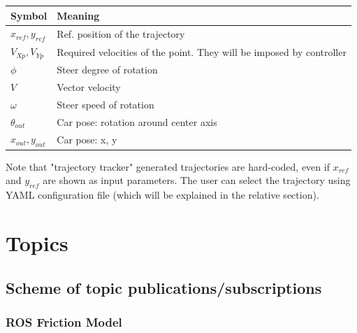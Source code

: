 \documentclass[12pt, letterpaper]{report}
\begin{document}
\vspace{1cm}

\begin{center}
	\begin{tabularx}{\textwidth}{|l|X|}
		\hline
		\textbf{Symbol} & \textbf{Meaning} \\
		\hline
		$x_{ref}, y_{ref}$ & Ref. position of the trajectory \\
		\hline
		$V_{Xp}, V_{Yp}$ & Required velocities of the point. They will be imposed by controller\\
		\hline
		$\phi$ & Steer degree of rotation \\
		\hline
		$V$ & Vector velocity \\
		\hline
		$\omega$ & Steer speed of rotation \\
		\hline
		$\theta_{out}$ & Car pose: rotation around center axis\\
		\hline
		$x_{out}, y_{out}$ & Car pose: x, y \\
		\hline
	\end{tabularx}
\end{center}

\vspace{1cm}

Note that "trajectory tracker" generated trajectories are hard-coded, even if $x_{ref}$ and $y_{ref}$ are shown as input parameters. The user can select the trajectory using YAML configuration file (which will be explained in the relative section).

\section{Topics}

\subsection{Scheme of topic publications/subscriptions}

\subsubsection{ROS Friction Model}
\end{document}
